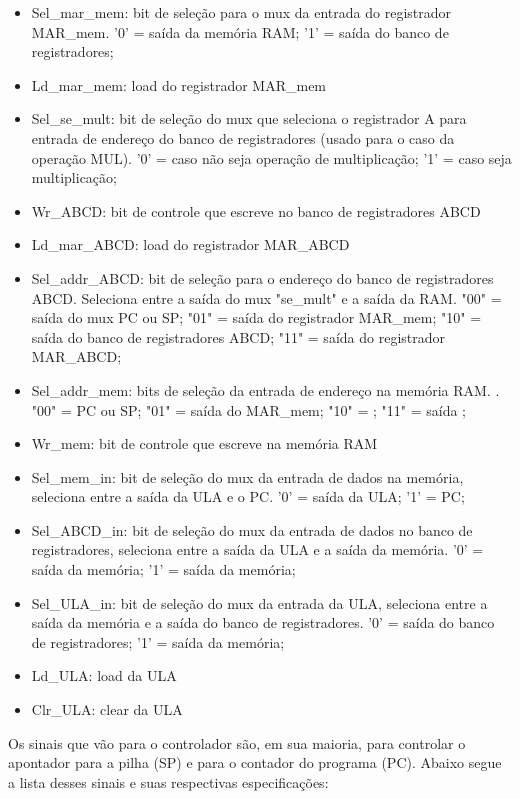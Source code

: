 \documentclass[12pt]{article}
\begin{document}
\begin{itemize}
\item Sel\_mar\_mem: bit de seleção para o mux da entrada do registrador MAR\_mem. '0' = saída da memória RAM; '1' = saída do banco de registradores;
\item Ld\_mar\_mem: load do registrador MAR\_mem
\item Sel\_se\_mult: bit de seleção do mux que seleciona o registrador A para entrada de endereço do banco de registradores (usado para o caso da operação MUL). '0' = caso não seja operação de multiplicação; '1' = caso seja multiplicação;
\item Wr\_ABCD: bit de controle que escreve no banco de registradores ABCD
\item Ld\_mar\_ABCD: load do registrador MAR\_ABCD
\item Sel\_addr\_ABCD: bit de seleção para o endereço do banco de registradores ABCD. Seleciona entre a saída do mux "se\_mult" e a saída da RAM. "00" = saída do mux PC ou SP; "01" = saída do registrador MAR\_mem; "10" = saída do banco de registradores ABCD; "11" = saída do registrador MAR\_ABCD;
\item Sel\_addr\_mem: bits de seleção da entrada de endereço na memória RAM. . "00" = PC ou SP; "01" = saída do MAR\_mem; "10" = ; "11" = saída ;
\item Wr\_mem: bit de controle que escreve na memória RAM
\item Sel\_mem\_in: bit de seleção do mux da entrada de dados na memória, seleciona entre a saída da ULA e o PC. '0' = saída da ULA; '1' = PC;
\item Sel\_ABCD\_in: bit de seleção do mux da entrada de dados no banco de registradores, seleciona entre a saída da ULA e a saída da memória. '0' = saída da memória; '1' = saída da memória;
\item Sel\_ULA\_in: bit de seleção do mux da entrada da ULA, seleciona entre a saída da memória e a saída do banco de registradores. '0' = saída do banco de registradores; '1' = saída da memória;
\item Ld\_ULA: load da ULA
\item Clr\_ULA: clear da ULA
\end{itemize}

Os sinais que vão para o controlador são, em sua maioria, para controlar o apontador para a pilha (SP) e para o contador do programa (PC). Abaixo segue a lista desses sinais e suas respectivas especificações:
\end{document}
